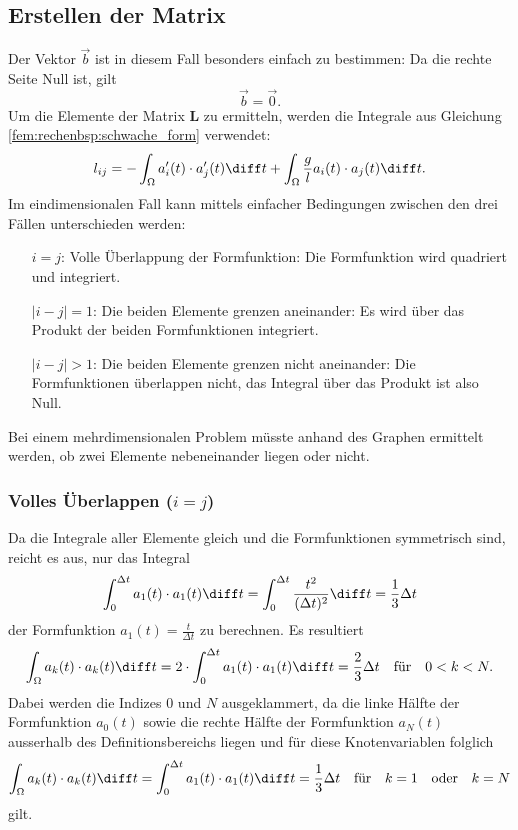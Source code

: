 \subsection{Erstellen der Matrix}
Der Vektor $\vec{b}$ ist in diesem Fall besonders einfach zu bestimmen: Da die rechte Seite Null ist, gilt
\begin{equation*}
    \vec{b} = \vec{0}.
\end{equation*}
Um die Elemente der Matrix $\mathbf{L}$ zu ermitteln, werden die Integrale aus Gleichung \eqref{fem:rechenbsp:schwache_form} verwendet:
\begin{equation*}
    l_{ij} = - \int_\Omega a_i'(t) \cdot a_j'(t) \diff t + \int_\Omega \frac{g}{l} a_i(t) \cdot a_j(t) \diff t.
\end{equation*}
Im eindimensionalen Fall kann mittels einfacher Bedingungen zwischen den drei Fällen unterschieden werden:
\begin{itemize}
    \item[$i = j$:] Volle Überlappung der Formfunktion: Die Formfunktion wird quadriert und integriert. 
    \item[$|i - j| = 1$:] Die beiden Elemente grenzen aneinander: Es wird über das Produkt der beiden Formfunktionen integriert.
    \item[$|i - j| > 1$:] Die beiden Elemente grenzen nicht aneinander: Die Formfunktionen überlappen nicht, das Integral über das Produkt ist also Null.
\end{itemize}
Bei einem mehrdimensionalen Problem müsste anhand des Graphen ermittelt werden, ob zwei Elemente nebeneinander liegen oder nicht.

\subsubsection{Volles Überlappen ($i = j$)}
Da die Integrale aller Elemente gleich und die Formfunktionen symmetrisch sind, reicht es aus, nur das Integral
\begin{equation*}
    \int_{0}^{\Delta t} a_1(t) \cdot a_1(t) \diff t
    = \int_{0}^{\Delta t} \frac{t^2}{(\Delta t)^2} \diff t 
    = \frac{1}{3} \Delta t
\end{equation*}
der Formfunktion $ a_1(t) = \frac{t}{\Delta t} $ zu berechnen.
Es resultiert
\begin{equation*}
    \int_\Omega a_k(t) \cdot a_k(t) \diff t 
    = 2 \cdot \int_{0}^{\Delta t} a_1(t) \cdot a_1(t) \diff t 
    = \frac{2}{3} \Delta t 
    \quad \text{für} \quad 0 < k < N.
\end{equation*}
Dabei werden die Indizes $0$ und $N$ ausgeklammert, da die linke Hälfte der Formfunktion $a_0(t)$ sowie die rechte Hälfte der Formfunktion $a_N(t)$ ausserhalb des Definitionsbereichs liegen und für diese Knotenvariablen folglich
\begin{equation*}
    \int_\Omega a_k(t) \cdot a_k(t) \diff t 
    = \int_{0}^{\Delta t} a_1(t) \cdot a_1(t) \diff t 
    = \frac{1}{3} \Delta t 
    \quad \text{für} \quad k = 1 \quad \text{oder} \quad k = N
\end{equation*}
gilt.

